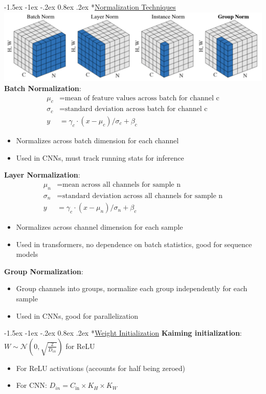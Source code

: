 \documentclass{article}
\makeatletter
\renewcommand\section{\@startsection{section}{1}{\z@}%
                                  {-1.5ex \@plus -1ex \@minus -.2ex}%
                                  {0.8ex \@plus.2ex}%
                                  {\normalfont\small\bfseries}}
\makeatother
\begin{document}
\begin{multicols}{3}
\section*{\underline{Normalization Techniques}}
\includegraphics[width=\columnwidth]{imgs/norm.png}
\textbf{Batch Normalization}:
\begin{align*}
\mu_c &= \text{mean of feature values across batch for channel c}\\
\sigma_c &= \text{standard deviation across batch for channel c}\\
y &= \gamma_c \cdot (x - \mu_c)/ \sigma_c + \beta_c
\end{align*}
\begin{itemize}
\item Normalizes across batch dimension for each channel
\item Used in CNNs, must track running stats for inference
\end{itemize}

\textbf{Layer Normalization}:
\begin{align*}
\mu_n &= \text{mean across all channels for sample n}\\
\sigma_n &= \text{standard deviation across all channels for sample n}\\
y &= \gamma_c \cdot (x - \mu_n)/ \sigma_n + \beta_c
\end{align*}
\begin{itemize}
\item Normalizes across channel dimension for each sample
\item Used in transformers, no dependence on batch statistics, good for sequence models
\end{itemize}

\textbf{Group Normalization}:
\begin{itemize}
\item Group channels into groups, normalize each group independently for each sample
\item Used in CNNs, good for parallelization
\end{itemize}

\section*{\underline{Weight Initialization}}
\textbf{Kaiming initialization}: $W \sim \mathcal{N}(0, \sqrt{\frac{2}{D_{in}}})$ for ReLU
\begin{itemize}
\item For ReLU activations (accounts for half being zeroed)
\item For CNN: $D_{in} = C_{\text{in}} \times K_H \times K_W$
\end{itemize}


\end{multicols}
\end{document}
